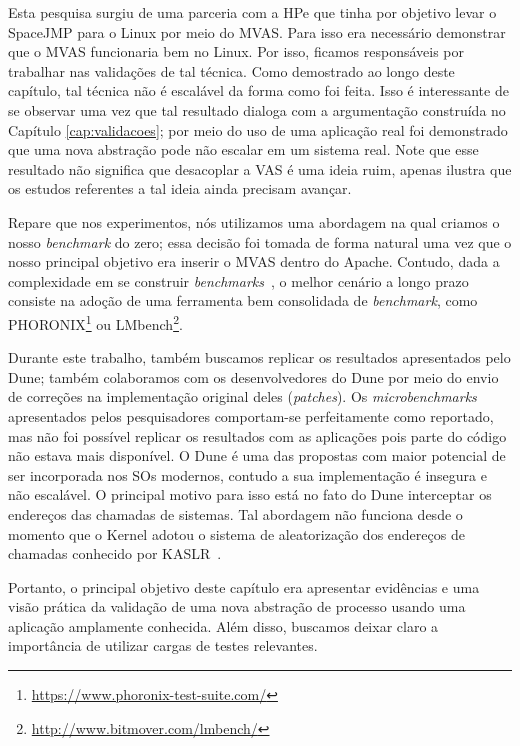Esta pesquisa surgiu de uma parceria com a HPe que tinha por objetivo levar o
SpaceJMP para o Linux por meio do MVAS. Para isso era necessário
demonstrar que o MVAS funcionaria bem no Linux. Por isso, ficamos responsáveis
por trabalhar nas validações de tal técnica. Como demostrado ao longo deste
capítulo, tal técnica não é escalável da forma como foi feita. Isso é
interessante de se observar uma vez que tal resultado dialoga com a
argumentação construída no Capítulo \ref{cap:validacoes}; por meio do uso de uma
aplicação real foi demonstrado que uma nova abstração pode não escalar em um sistema real.
Note que esse resultado não significa que desacoplar a VAS é uma ideia ruim,
apenas ilustra que os estudos referentes a tal ideia ainda precisam avançar.

Repare que nos experimentos, nós utilizamos uma abordagem na qual criamos o
nosso \emph{benchmark} do zero; essa decisão foi tomada de forma natural uma
vez que o nosso principal objetivo era inserir o MVAS dentro do Apache.
Contudo, dada a complexidade em se construir
\emph{benchmarks}~\citep{benchrocketscience}, o melhor cenário a longo prazo
consiste na adoção de uma ferramenta bem consolidada de \emph{benchmark}, como
PHORONIX\footnote{\url{https://www.phoronix-test-suite.com/}} ou
LMbench\footnote{\url{http://www.bitmover.com/lmbench/}}.

Durante este trabalho, também buscamos replicar os resultados apresentados pelo
Dune; também colaboramos com os desenvolvedores do Dune por meio do envio de
correções na implementação original deles (\textit{patches}). Os
\textit{microbenchmarks} apresentados pelos pesquisadores comportam-se
perfeitamente como reportado, mas não foi possível replicar os resultados com
as aplicações pois parte do código não estava mais disponível. O Dune é uma das
propostas com maior potencial de ser incorporada nos SOs modernos, contudo a
sua implementação é insegura e não escalável. O principal motivo para isso está
no fato do Dune interceptar os endereços das chamadas de sistemas. Tal
abordagem não funciona desde o momento que o Kernel adotou o sistema de
aleatorização dos endereços de chamadas conhecido por KASLR~\citep{kaslr}.

Portanto, o principal objetivo deste capítulo era apresentar evidências e uma
visão prática da validação de uma nova abstração de processo usando uma
aplicação amplamente conhecida. Além disso, buscamos deixar claro a importância
de utilizar cargas de testes relevantes.
